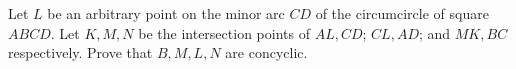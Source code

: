 Let $L$ be an arbitrary point on the minor arc $CD$ of the circumcircle of square $ABCD$. Let $K,M,N$ be the intersection points of $AL,CD$; $CL,AD$; and $MK,BC$ respectively. Prove that $B,M,L,N$ are concyclic.